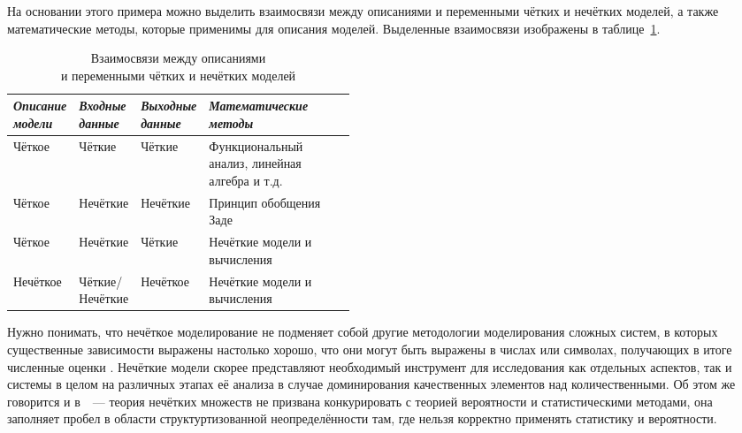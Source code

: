 На основании этого примера можно выделить взаимосвязи между описаниями и переменными чётких и нечётких моделей, а также математические методы, которые применимы для описания моделей. Выделенные взаимосвязи изображены в таблице~\ref{t:fuzzy-modeling-approaches}.
\begin{table}[h!]
\caption{Взаимосвязи между описаниями \\ и переменными чётких и нечётких моделей}
\label{t:fuzzy-modeling-approaches}
\begin{center}
\begin{tabularx}{\textwidth}{|p{0.15\linewidth}|p{0.15\linewidth}|p{0.15\linewidth}|X|}
	\hline
		\centering \textit{Описание модели} & \centering \textit{Входные данные} & \centering \textit{Выходные данные} & \centering \textit{Математические методы} \tabularnewline
	\hline
	\hline
		Чёткое & Чёткие & Чёткие & Функциональный анализ, линейная алгебра и т.д. \tabularnewline
	\hline
		Чёткое & Нечёткие & Нечёткие & Принцип обобщения Заде \tabularnewline
	\hline
		Чёткое & Нечёткие & Чёткие & Нечёткие модели и вычисления \tabularnewline
	\hline
		Нечёткое & Чёткие/\allowbreak Нечёткие & Нечёткое & Нечёткие модели и вычисления \tabularnewline
	\hline
\end{tabularx}
\end{center}
\end{table}

Нужно понимать, что нечёткое моделирование не подменяет собой другие методологии моделирования сложных систем, в которых существенные зависимости выражены настолько хорошо, что они могут быть выражены в числах или символах, получающих в итоге численные оценки \cite{Borisov_Fedulov}. Нечёткие модели скорее представляют необходимый инструмент для исследования как отдельных аспектов, так и системы в целом на различных этапах её анализа в случае доминирования качественных элементов над количественными. Об этом же говорится и в~\cite{Kaufmann}~--- теория нечётких множеств не призвана конкурировать с теорией вероятности и статистическими методами, она заполняет пробел в области структуртизованной неопределённости там, где нельзя корректно применять статистику и вероятности.

